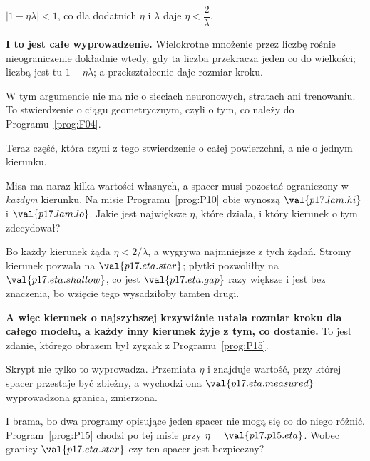 \begin{fr}
\begin{ansblock}
$\lvert 1 - \eta\lambda \rvert < 1$, co dla dodatnich $\eta$ i $\lambda$ daje
$\eta < \dfrac{2}{\lambda}$.
\end{ansblock}

\textbf{I to jest całe wyprowadzenie.} Wielokrotne mnożenie przez liczbę
rośnie nieograniczenie dokładnie wtedy, gdy ta liczba przekracza jeden co do
wielkości; liczbą jest tu $1 - \eta\lambda$; a przekształcenie daje rozmiar
kroku.

W tym argumencie nie ma nic o sieciach neuronowych, stratach ani trenowaniu.
To stwierdzenie o ciągu geometrycznym, czyli o tym, co należy do
Programu~\ref{prog:F04}.

\end{fr}

\begin{fr}
Teraz część, która czyni z tego stwierdzenie o całej powierzchni, a nie o
jednym kierunku.

Misa ma naraz kilka wartości własnych, a spacer musi pozostać ograniczony w
\emph{każdym} kierunku. Na misie Programu~\ref{prog:P10} obie wynoszą
$\val{p17.lam.hi}$ i $\val{p17.lam.lo}$. Jakie jest największe $\eta$, które
działa, i który kierunek o tym zdecydował?
\dotline
\nextframe
\end{fr}

\begin{fr}
Bo każdy kierunek żąda $\eta < 2/\lambda$, a wygrywa najmniejsze z tych żądań.
Stromy kierunek pozwala na $\val{p17.eta.star}$; płytki pozwoliłby na
$\val{p17.eta.shallow}$, co jest $\val{p17.eta.gap}$ razy większe i jest bez
znaczenia, bo wzięcie tego wysadziłoby tamten drugi.

\textbf{A więc kierunek o najszybszej krzywiźnie ustala rozmiar kroku dla
całego modelu, a każdy inny kierunek żyje z tym, co dostanie.} To jest zdanie,
którego obrazem był zygzak z Programu~\ref{prog:P15}.

Skrypt nie tylko to wyprowadza. Przemiata $\eta$ i znajduje wartość, przy
której spacer przestaje być zbieżny, a wychodzi ona
$\val{p17.eta.measured}$ \dash{} wyprowadzona granica, zmierzona.
\end{fr}

\begin{fr}
I brama, bo dwa programy opisujące jeden spacer nie mogą się co do niego
różnić. Program~\ref{prog:P15} chodzi po tej misie przy
$\eta = \val{p17.p15.eta}$. Wobec granicy $\val{p17.eta.star}$ \dash{} czy ten
spacer jest bezpieczny?
\nextframe
\end{fr}


